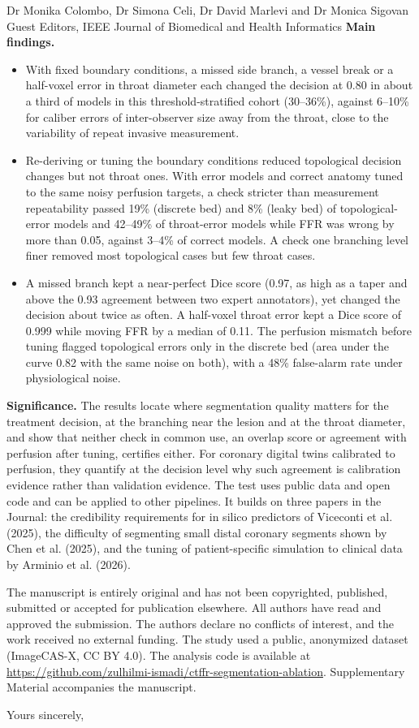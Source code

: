 \documentclass[10pt]{letter}
\begin{document}
\begin{letter}{Dr Monika Colombo, Dr Simona Celi, Dr David Marlevi and Dr Monica Sigovan\\Guest Editors, IEEE Journal of Biomedical and Health Informatics}
\textbf{Main findings.}
\begin{itemize}[nosep,leftmargin=1.2em]
\item With fixed boundary conditions, a missed side branch, a vessel break or a half-voxel error in throat diameter
each changed the decision at 0.80 in about a third of models in this threshold-stratified cohort (30--36\%), against
6--10\% for caliber errors of inter-observer size away from the throat, close to the variability of repeat invasive
measurement.
\item Re-deriving or tuning the boundary conditions reduced topological decision changes but not throat ones. With
error models and correct anatomy tuned to the same noisy perfusion targets, a check stricter than measurement
repeatability passed 19\% (discrete bed) and 8\% (leaky bed) of topological-error models and 42--49\% of throat-error
models while FFR was wrong by more than 0.05, against 3--4\% of correct models. A check one branching level finer
removed most topological cases but few throat cases.
\item A missed branch kept a near-perfect Dice score (0.97, as high as a taper and above the 0.93 agreement between two
expert annotators), yet changed the decision about twice as often. A half-voxel throat error kept a Dice score of 0.999 while moving FFR by a median of 0.11. The perfusion mismatch before tuning flagged topological errors only in the discrete bed (area under the curve 0.82 with the same noise on both), with a 48\% false-alarm rate under physiological noise.
\end{itemize}

\textbf{Significance.} The results locate where segmentation quality matters for the treatment decision, at the
branching near the lesion and at the throat diameter, and show that neither check in common use, an overlap score or
agreement with perfusion after tuning, certifies either. For coronary digital twins calibrated to perfusion, they
quantify at the decision level why such agreement is calibration evidence rather than validation evidence. The test uses public data and open code and can be applied to other pipelines. It builds on three papers in the Journal: the credibility requirements for in silico predictors of
Viceconti et al. (2025), the difficulty of segmenting small distal coronary segments shown by Chen et al. (2025), and
the tuning of patient-specific simulation to clinical data by Arminio et al. (2026).

The manuscript is entirely original and has not been copyrighted, published, submitted or accepted for publication
elsewhere. All authors have read
and approved the submission. The authors declare no conflicts of interest, and the work received no external funding.
The study used a public, anonymized dataset (ImageCAS-X, CC BY 4.0). The analysis code is available at \url{https://github.com/zulhilmi-ismadi/ctffr-segmentation-ablation}. Supplementary Material accompanies the manuscript.

\closing{Yours sincerely,}
\end{letter}
\end{document}
